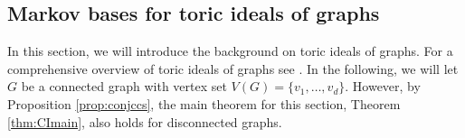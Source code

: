 \documentclass[a4paper, 12pt]{article}
\theoremstyle{plain}
\theoremstyle{definition}
\theoremstyle{remark}
\begin{document}






\subsection{Markov bases for toric ideals of graphs}\label{sec: graphs markov bases}





    

 
In this section, we will introduce the background on toric ideals of graphs. For a comprehensive overview of toric ideals of graphs see \cite[Section 2]{Reyes2012minimal}. In the following, we will let $G$ be a connected graph with vertex set $V(G)=\{v_1,\dots ,v_d\}$. However, by Proposition \ref{prop:conjccs}, the main theorem for this section, Theorem \ref{thm:CImain}, also holds for disconnected graphs.
\end{document}
